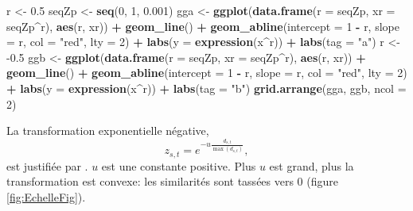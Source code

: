 \documentclass[
  11pt,
  french,
  a4paper,
  extrafontsizes,onecolumn,openright
  ]{memoir}
\newenvironment{Shaded}{\begin{snugshade}}{\end{snugshade}}
\newcommand{\DataTypeTok}[1]{\textcolor[rgb]{0.13,0.29,0.53}{#1}}
\newcommand{\DecValTok}[1]{\textcolor[rgb]{0.00,0.00,0.81}{#1}}
\newcommand{\FloatTok}[1]{\textcolor[rgb]{0.00,0.00,0.81}{#1}}
\newcommand{\KeywordTok}[1]{\textcolor[rgb]{0.13,0.29,0.53}{\textbf{#1}}}
\newcommand{\NormalTok}[1]{#1}
\newcommand{\OperatorTok}[1]{\textcolor[rgb]{0.81,0.36,0.00}{\textbf{#1}}}
\newcommand{\StringTok}[1]{\textcolor[rgb]{0.31,0.60,0.02}{#1}}
\begin{document}
\begin{Shaded}
\begin{Highlighting}[]
\NormalTok{r <-}\StringTok{ }\FloatTok{0.5}
\NormalTok{seqZp <-}\StringTok{ }\KeywordTok{seq}\NormalTok{(}\DecValTok{0}\NormalTok{, }\DecValTok{1}\NormalTok{, }\FloatTok{0.001}\NormalTok{)}
\NormalTok{gga <-}\StringTok{ }\KeywordTok{ggplot}\NormalTok{(}\KeywordTok{data.frame}\NormalTok{(}\DataTypeTok{r =}\NormalTok{ seqZp, }\DataTypeTok{xr =}\NormalTok{ seqZp}\OperatorTok{^}\NormalTok{r), }\KeywordTok{aes}\NormalTok{(r, xr)) }\OperatorTok{+}\StringTok{ }
\StringTok{    }\KeywordTok{geom_line}\NormalTok{() }\OperatorTok{+}\StringTok{ }\KeywordTok{geom_abline}\NormalTok{(}\DataTypeTok{intercept =} \DecValTok{1} \OperatorTok{-}\StringTok{ }\NormalTok{r, }\DataTypeTok{slope =}\NormalTok{ r, }\DataTypeTok{col =} \StringTok{"red"}\NormalTok{, }
    \DataTypeTok{lty =} \DecValTok{2}\NormalTok{) }\OperatorTok{+}\StringTok{ }\KeywordTok{labs}\NormalTok{(}\DataTypeTok{y =} \KeywordTok{expression}\NormalTok{(x}\OperatorTok{^}\NormalTok{r)) }\OperatorTok{+}\StringTok{ }\KeywordTok{labs}\NormalTok{(}\DataTypeTok{tag =} \StringTok{"a"}\NormalTok{)}
\NormalTok{r <-}\StringTok{ }\FloatTok{-0.5}
\NormalTok{ggb <-}\StringTok{ }\KeywordTok{ggplot}\NormalTok{(}\KeywordTok{data.frame}\NormalTok{(}\DataTypeTok{r =}\NormalTok{ seqZp, }\DataTypeTok{xr =}\NormalTok{ seqZp}\OperatorTok{^}\NormalTok{r), }\KeywordTok{aes}\NormalTok{(r, xr)) }\OperatorTok{+}\StringTok{ }
\StringTok{    }\KeywordTok{geom_line}\NormalTok{() }\OperatorTok{+}\StringTok{ }\KeywordTok{geom_abline}\NormalTok{(}\DataTypeTok{intercept =} \DecValTok{1} \OperatorTok{-}\StringTok{ }\NormalTok{r, }\DataTypeTok{slope =}\NormalTok{ r, }\DataTypeTok{col =} \StringTok{"red"}\NormalTok{, }
    \DataTypeTok{lty =} \DecValTok{2}\NormalTok{) }\OperatorTok{+}\StringTok{ }\KeywordTok{labs}\NormalTok{(}\DataTypeTok{y =} \KeywordTok{expression}\NormalTok{(x}\OperatorTok{^}\NormalTok{r)) }\OperatorTok{+}\StringTok{ }\KeywordTok{labs}\NormalTok{(}\DataTypeTok{tag =} \StringTok{"b"}\NormalTok{)}
\KeywordTok{grid.arrange}\NormalTok{(gga, ggb, }\DataTypeTok{ncol =} \DecValTok{2}\NormalTok{)}
\end{Highlighting}
\end{Shaded}

\normalsize

La transformation exponentielle négative,
\[z_{s,t} = e^{-u \frac{d_{s,t}}{\max{(d_{s,t})}}},\]
est justifiée par \textcite{Leinster2013}.
\(u\) est une constante positive.
Plus \(u\) est grand, plus la transformation est convexe: les similarités sont tassées vers 0 (figure \ref{fig:EchelleFig}).
\end{document}
